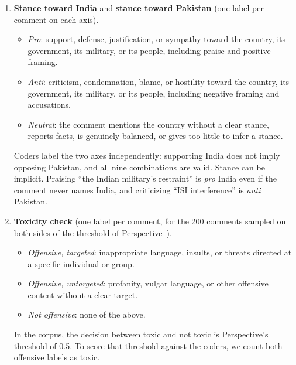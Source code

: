 \begin{enumerate}
\item \textbf{Stance toward India} and \textbf{stance toward Pakistan} (one label
per comment on each axis).
\begin{itemize}
\item \textit{Pro}: support, defense, justification, or sympathy toward the
country, its government, its military, or its people, including praise and
positive framing.
\item \textit{Anti}: criticism, condemnation, blame, or hostility toward the
country, its government, its military, or its people, including negative framing
and accusations.
\item \textit{Neutral}: the comment mentions the country without a clear stance,
reports facts, is genuinely balanced, or gives too little to infer a stance.
\end{itemize}
Coders label the two axes independently: supporting India does not imply opposing
Pakistan, and all nine combinations are valid. Stance can be implicit. Praising
``the Indian military's restraint'' is \textit{pro} India even if the comment never
names India, and criticizing ``ISI interference'' is \textit{anti} Pakistan.

\item \textbf{Toxicity check} (one label per comment, for the 200 comments sampled
on both sides of the threshold of
Perspective~\cite{jigsaw2018perspective,lees2022perspective}).
\begin{itemize}
\item \textit{Offensive, targeted}: inappropriate language, insults, or threats
directed at a specific individual or group.
\item \textit{Offensive, untargeted}: profanity, vulgar language, or other
offensive content without a clear target.
\item \textit{Not offensive}: none of the above.
\end{itemize}
In the corpus, the decision between toxic and not toxic is Perspective's threshold
of 0.5. To score that threshold against the coders, we count both offensive labels
as toxic.


\end{enumerate}

